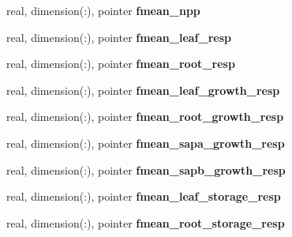 \begin{DoxyCompactItemize}
\item 
\hypertarget{structed__state__vars_1_1edtype_ac6d5c69e255e0c40c6d1937d2432f607}{
real, dimension(:), pointer {\bfseries fmean\_\-npp}}
\label{structed__state__vars_1_1edtype_ac6d5c69e255e0c40c6d1937d2432f607}

\item 
\hypertarget{structed__state__vars_1_1edtype_aa47efd104626eecc0b62fa3f11cdca04}{
real, dimension(:), pointer {\bfseries fmean\_\-leaf\_\-resp}}
\label{structed__state__vars_1_1edtype_aa47efd104626eecc0b62fa3f11cdca04}

\item 
\hypertarget{structed__state__vars_1_1edtype_a80d0e20c25cc1e7a84b1e0d9fb9a97d0}{
real, dimension(:), pointer {\bfseries fmean\_\-root\_\-resp}}
\label{structed__state__vars_1_1edtype_a80d0e20c25cc1e7a84b1e0d9fb9a97d0}

\item 
\hypertarget{structed__state__vars_1_1edtype_a0cd747742a3e84ef86adaded57d34e17}{
real, dimension(:), pointer {\bfseries fmean\_\-leaf\_\-growth\_\-resp}}
\label{structed__state__vars_1_1edtype_a0cd747742a3e84ef86adaded57d34e17}

\item 
\hypertarget{structed__state__vars_1_1edtype_ae389543ab0169536abbab19ef8e222e1}{
real, dimension(:), pointer {\bfseries fmean\_\-root\_\-growth\_\-resp}}
\label{structed__state__vars_1_1edtype_ae389543ab0169536abbab19ef8e222e1}

\item 
\hypertarget{structed__state__vars_1_1edtype_a28a474a74005aab43107270c93b186c4}{
real, dimension(:), pointer {\bfseries fmean\_\-sapa\_\-growth\_\-resp}}
\label{structed__state__vars_1_1edtype_a28a474a74005aab43107270c93b186c4}

\item 
\hypertarget{structed__state__vars_1_1edtype_a9ab0e2f6d814f8165d3bbe89edcc7663}{
real, dimension(:), pointer {\bfseries fmean\_\-sapb\_\-growth\_\-resp}}
\label{structed__state__vars_1_1edtype_a9ab0e2f6d814f8165d3bbe89edcc7663}

\item 
\hypertarget{structed__state__vars_1_1edtype_aa53ba8c2dae6517d7fe7e4edd7beab90}{
real, dimension(:), pointer {\bfseries fmean\_\-leaf\_\-storage\_\-resp}}
\label{structed__state__vars_1_1edtype_aa53ba8c2dae6517d7fe7e4edd7beab90}

\item 
\hypertarget{structed__state__vars_1_1edtype_a54b19c909ba22f1ad779990434a0403c}{
real, dimension(:), pointer {\bfseries fmean\_\-root\_\-storage\_\-resp}}
\label{structed__state__vars_1_1edtype_a54b19c909ba22f1ad779990434a0403c}


\end{DoxyCompactItemize}
